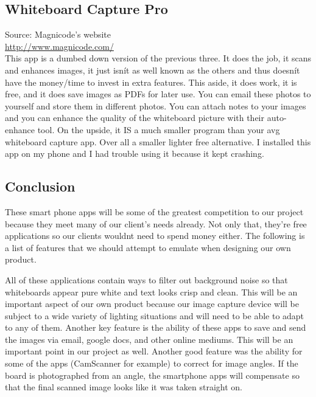 \documentclass[]{article}
\begin{document}
				\subsection{Whiteboard Capture Pro}
Source: Magnicode's website\\
{\color{red} \url{http://www.magnicode.com/}} \\
					
This app is a dumbed down version of the previous three. It does the job, it scans and enhances images, it just isnít as well known as the others and thus doesnít have the money/time to invest in extra features. This aside, it does work, it is free, and it does save images as PDFs for later use. You can email these photos to yourself and store them in different photos. You can attach notes to your images and you can enhance the quality of the whiteboard picture with their auto-enhance tool. On the upside, it IS a much smaller program than your avg whiteboard capture app. Over all a smaller lighter free alternative. I installed this app on my phone and I had trouble using it because it kept crashing. \\

     \subsection*{Conclusion}
These smart phone apps will be some of the greatest competition to our project because they meet many of our client's needs already. Not only that, they're free applications so our clients wouldnt need to spend money either. The following is a list of features that we should attempt to emulate when designing our own product.

All of these applications contain ways to filter out background noise so that whiteboards appear pure white and text looks crisp and clean. This will be an important aspect of our own product because our image capture device will be subject to a wide variety of lighting situations and will need to be able to adapt to any of them.
Another key feature is the ability of these apps to save and send the images via email, google docs, and other online mediums. This will be an important point in our project as well.
Another good feature was the ability for some of the apps (CamScanner for example) to correct for image angles. If the board is photographed from an angle, the smartphone apps will compensate so that the final scanned image looks like it was taken straight on. \\
\end{document}
